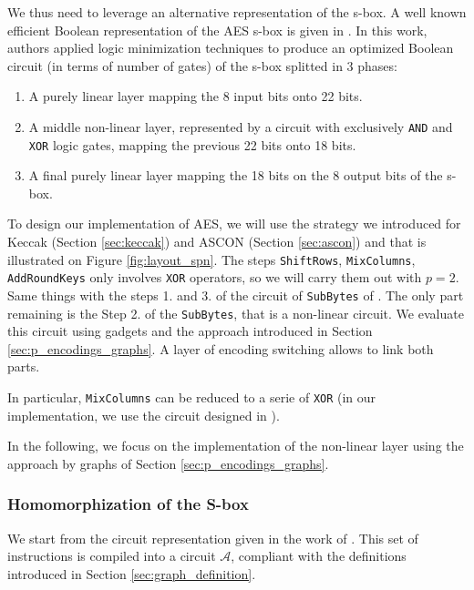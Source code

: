 We thus need to leverage an alternative representation of the s-box. A well known efficient Boolean representation of the AES s-box is given in \cite{boyar}. In this work, authors applied logic minimization techniques to produce an optimized Boolean circuit (in terms of number of gates) of the s-box splitted in 3 phases:

\begin{enumerate}
    \item A purely linear layer mapping the 8 input bits onto 22 bits.
    \item A middle non-linear layer, represented by a circuit with exclusively \texttt{AND} and \texttt{XOR} logic gates, mapping the previous 22 bits onto 18 bits.
    \item A final purely linear layer mapping the 18 bits on the 8 output bits of the s-box.
\end{enumerate}


To design our implementation of AES, we will use the strategy we introduced for Keccak (Section \ref{sec:keccak}) and ASCON (Section \ref{sec:ascon}) and that is illustrated on Figure \ref{fig:layout_spn}. The steps \texttt{ShiftRows}, \texttt{MixColumns}, \texttt{AddRoundKeys} only involves \texttt{XOR} operators, so we will carry them out with $p=2$. Same things with the steps 1. and 3. of the circuit of \texttt{SubBytes} of \cite{boyar}. The only part remaining is the Step 2. of the \texttt{SubBytes}, that is a non-linear circuit. We evaluate this circuit using gadgets and the approach introduced in Section \ref{sec:p_encodings_graphs}. A layer of encoding switching allows to link both parts.

 In particular, \texttt{MixColumns} can be reduced to a serie of \texttt{XOR} (in our implementation, we use the circuit designed in \cite{EPRINT:Maximov19}). 

In the following, we focus on the implementation of the non-linear layer using the approach by graphs of Section \ref{sec:p_encodings_graphs}.


\subsubsection{Homomorphization of the S-box}


We start from the circuit representation given in the work of \cite{boyar}. This set of instructions is compiled into a circuit $\mathcal{A}$, compliant with the definitions introduced in Section \ref{sec:graph_definition}.


